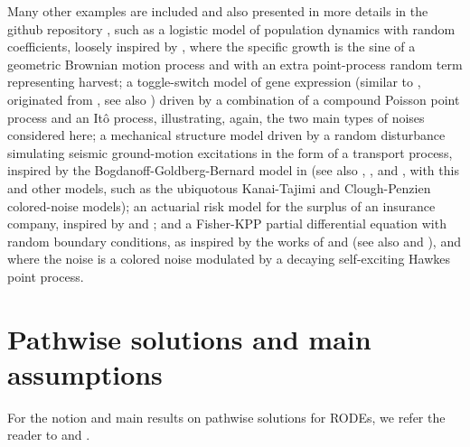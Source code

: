 \documentclass[reqno,12pt]{amsart}
\theoremstyle{plain} %
\theoremstyle{definition} %
\begin{document}
Many other examples are included and also presented in more details in the github repository \cite{RODEConvEM2023}, such as a logistic model of population dynamics with random coefficients, loosely inspired by \cite[Section 15.2]{HanKloeden2017}, where the specific growth is the sine of a geometric Brownian motion process and with an extra point-process random term representing harvest; a toggle-switch model of gene expression (similar to \cite[Section 7.8]{Asai2016}, originated from \cite{VerdCrombachJaeger2014}, see also \cite{StrasserTheisMarr2012}) driven by a combination of a compound Poisson point process and an It\^o process, illustrating, again, the two main types of noises considered here; a mechanical structure model driven by a random disturbance simulating seismic ground-motion excitations in the form of a transport process, inspired by the Bogdanoff-Goldberg-Bernard model in \cite{BogdanoffGoldbergBernard1961} (see also \cite[Chapter 18]{NeckelRupp2013}, \cite{HousnerJenning1964}, and \cite{Kanai1957}, with this and other models, such as the ubiquotous Kanai-Tajimi and Clough-Penzien colored-noise models); an actuarial risk model for the surplus of an insurance company, inspired by \cite{GerberShiu1998} and \cite{BrigoMercurio2006}; and a Fisher-KPP partial differential equation with random boundary conditions, as inspired by the works of \cite{SalakoShen2020} and \cite{FreidlinWentzell1992} (see also \cite{Fisher1937} and \cite{KPP1937}), and where the noise is a colored noise modulated by a decaying self-exciting Hawkes point process.

\section{Pathwise solutions and main assumptions}
\label{secpathwisesolution}

For the notion and main results on pathwise solutions for RODEs, we refer the reader to \cite[Section 2.1]{HanKloeden2017} and \cite[Section 3.3]{NeckelRupp2013}.
\end{document}
